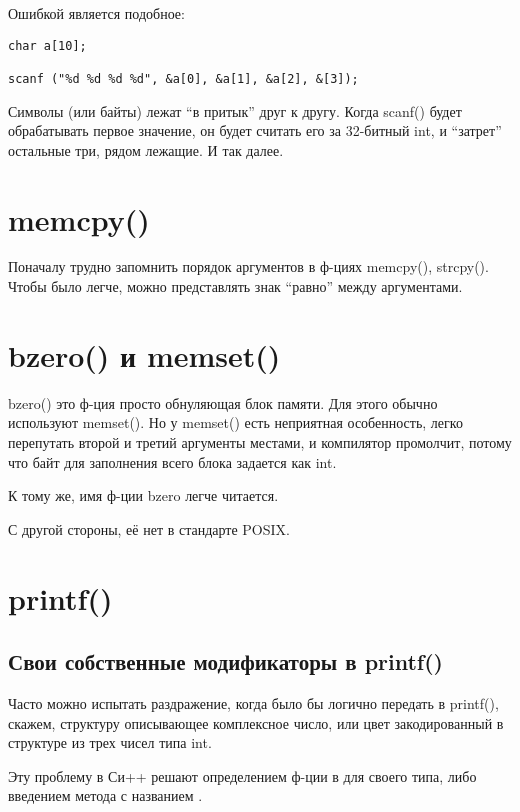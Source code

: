 Ошибкой является подобное:

\begin{lstlisting}
char a[10];

scanf ("%d %d %d %d", &a[0], &a[1], &a[2], &[3]);
\end{lstlisting}

Символы (или байты) лежат ``в притык'' друг к другу. Когда scanf() будет обрабатывать первое значение, он будет считать
его за 32-битный int, и ``затрет'' остальные три, рядом лежащие. И так далее.

\label{memcpy}
\section{memcpy()}

Поначалу трудно запомнить порядок аргументов в ф-циях memcpy(), strcpy(). Чтобы было легче, можно представлять
знак ``равно'' между аргументами.

\label{bzero}
\section{bzero() и memset()}

bzero() это ф-ция просто обнуляющая блок памяти.
Для этого обычно используют memset(). Но у memset() есть неприятная особенность, легко перепутать второй
и третий аргументы местами, и компилятор промолчит, потому что байт для заполнения всего блока задается как int.

К тому же, имя ф-ции bzero легче читается.

С другой стороны, её нет в стандарте POSIX.

\label{printf}
\section{printf()}

\subsection{Свои собственные модификаторы в printf()}

Часто можно испытать раздражение, когда было бы логично передать в printf(), скажем, структуру описывающее комплексное
число, или цвет закодированный в структуре из трех чисел типа int.

Эту проблему в Си++ решают определением ф-ции  в  для своего типа, либо введением
метода с названием .

